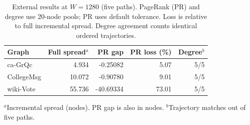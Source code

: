 \begin{table}[htbp]
\caption{External results at $W=1280$ (five paths). PageRank (PR) and degree use 20-node pools; PR uses default tolerance. Loss is relative to full incremental spread. Degree agreement counts identical ordered trajectories.}\label{tab:primary}
\begin{tabular}{lrrrr}
\toprule
Graph & Full spread$^a$ & PR gap & PR loss (\%) & Degree$^b$ \\
\midrule
ca-GrQc & 4.934 & -0.25082 & 5.07 & 5/5 \\
CollegeMsg & 10.072 & -0.90780 & 9.01 & 5/5 \\
wiki-Vote & 55.736 & -40.69334 & 73.01 & 5/5 \\
\bottomrule
\end{tabular}
\par\smallskip\footnotesize $^a$Incremental spread (nodes). PR gap is also in nodes. $^b$Trajectory matches out of five paths.
\end{table}
